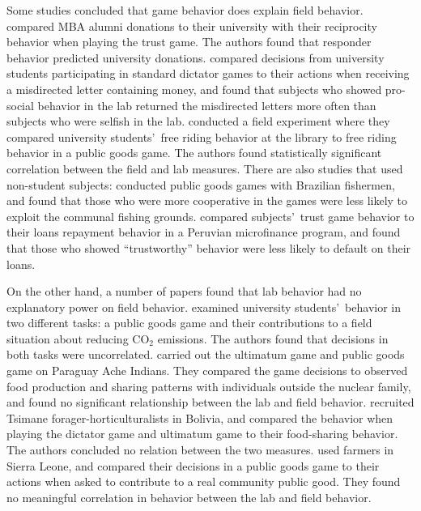 \documentclass[12pt]{article}
\begin{document}
Some studies concluded that game behavior does explain field behavior. \cite{baran_2010} compared MBA alumni donations to their university with their reciprocity behavior when playing the trust game. The authors found that responder behavior predicted university donations. \cite{franzen_pointner_2012} compared decisions from university students participating in standard dictator games to their actions when receiving a misdirected letter containing money, and found that subjects who showed pro-social behavior in the lab returned the misdirected letters more often than subjects who were selfish in the lab. \cite{englmaier_gebhardt_2011} conducted a field experiment where they compared university students\rq \ free riding behavior at the library to free riding behavior in a public goods game. The authors found statistically significant correlation between the field and lab measures. There are also studies that used non-student subjects: \cite{fehr_leibbrandt_2011} conducted public goods games with Brazilian fishermen, and found that those who were more cooperative in the games were less likely to exploit the communal fishing grounds. \cite{karlan_2005} compared subjects\rq \ trust game behavior to their loans repayment behavior in a Peruvian microfinance program, and found that those who showed ``trustworthy'' behavior were less likely to default on their loans. 

On the other hand, a number of papers found that lab behavior had no explanatory power on field behavior. \cite{goeschl_2015} examined university students\rq \ behavior in two different tasks: a public goods game and their contributions to a field situation about reducing CO$_{2}$ emissions. The authors found that decisions in both tasks were uncorrelated. \cite{hill_gurven_2004} carried out the ultimatum game and public goods game on Paraguay Ache Indians. They compared the game decisions to observed food production and sharing patterns with individuals outside the nuclear family, and found no significant relationship between the lab and field behavior. \cite{gurven_winking_2008} recruited Tsimane forager-horticulturalists in Bolivia, and compared the behavior when playing the dictator game and ultimatum game to their food-sharing behavior. The authors concluded no relation between the two measures. \cite{voors_2012} used farmers in Sierra Leone, and compared their decisions in a public goods game to their actions when asked to contribute to a real community public good. They found no meaningful correlation in behavior between the lab and field behavior. 
\end{document}

